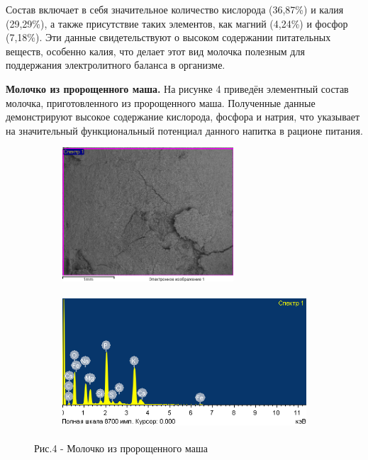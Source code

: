 \begin{multicols}{2}
Состав включает в себя значительное количество кислорода (36,87\%) и
калия (29,29\%), а также присутствие таких элементов, как магний
(4,24\%) и фосфор (7,18\%). Эти данные свидетельствуют о высоком
содержании питательных веществ, особенно калия, что делает этот вид
молочка полезным для поддержания электролитного баланса в организме.

{\bfseries Молочко из пророщенного маша.} На рисунке 4 приведён элементный
состав молочка, приготовленного из пророщенного маша. Полученные данные
демонстрируют высокое содержание кислорода, фосфора и натрия, что
указывает на значительный функциональный потенциал данного напитка в
рационе питания.
\end{multicols}

\begin{figure}[H]
	\centering
	\begin{subfigure}{0.4\textwidth}
		\centering
		\includegraphics[height=5cm]{media/pish/image51}
	\end{subfigure}
	\hfill
	\begin{subfigure}{0.55\textwidth}
		\centering
		\includegraphics[height=5cm]{media/pish/image50}
	\end{subfigure}
	\caption*{Рис.4 - Молочко из пророщенного маша}
\end{figure}

